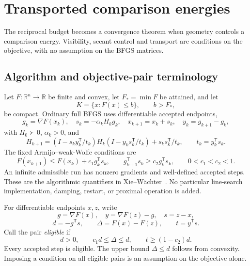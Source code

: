 \chapter{Transported comparison energies}\label{comp:T}\label{T:chapter}
\renewcommand{\ModuleTag}{3}
The reciprocal budget becomes a convergence theorem when geometry controls a comparison energy. Visibility, secant control and transport are conditions on the objective, with no assumption on the BFGS matrices.


\begingroup
\providecommand{\R}{}
\renewcommand{\R}{\mathbb R}
\providecommand{\tr}{}
\renewcommand{\tr}{\operatorname{tr}}
\providecommand{\diag}{}
\renewcommand{\diag}{\operatorname{diag}}
\providecommand{\Span}{}
\renewcommand{\Span}{\operatorname{span}}
\providecommand{\ip}{}
\renewcommand{\ip}[2]{\langle #1,#2\rangle}
\providecommand{\norm}{}
\renewcommand{\norm}[1]{\lVert #1\rVert}
\providecommand{\T}{}
\renewcommand{\T}{^{\mathsf T}}
\providecommand{\D}{}
\renewcommand{\D}{\mathcal D}
\setcounter{section}{1}
\setcounter{theorem}{0}
\setcounter{lemma}{0}
\setcounter{corollary}{0}
\setcounter{proposition}{0}
\setcounter{remark}{0}
\setcounter{equation}{2}


\section{Algorithm and objective-pair terminology}
Let $F:\R^n\to\R$ be finite and convex, let $F_*=\min F$ be attained, and let
\[
 K=\{x:F(x)\le b\},\qquad b>F_*,
\]
be compact. Ordinary full BFGS uses differentiable accepted endpoints,
\[
 g_k=\nabla F(x_k),\quad s_k=-\alpha_kH_kg_k,\quad
 x_{k+1}=x_k+s_k,\quad y_k=g_{k+1}-g_k,
\]
with $H_0\succ0$, $\alpha_k>0$, and
\[
 H_{k+1}=(I-s_ky_k\T/t_k)H_k(I-y_ks_k\T/t_k)+s_ks_k\T/t_k,
 \qquad t_k=y_k\T s_k.
\]
The fixed Armijo--weak-Wolfe conditions are
\[
 F(x_{k+1})\le F(x_k)+c_1g_k\T s_k,\qquad
 g_{k+1}\T s_k\ge c_2g_k\T s_k,\qquad 0<c_1<c_2<1.
\]
An infinite admissible run has nonzero gradients and well-defined accepted steps. These are the algorithmic quantifiers in Xie--W\"achter~\cite{XW}. No particular line-search implementation, damping, restart, or proximal operation is added.

For differentiable endpoints $x,z$, write
\[
 g=\nabla F(x),\quad y=\nabla F(z)-g,\quad s=z-x,
\]
\[
 d=-g\T s,\qquad \Delta=F(x)-F(z),\qquad t=y\T s.
\]
Call the pair \emph{eligible} if
\begin{equation}
 d>0,\qquad c_1d\le\Delta\le d,\qquad t\ge(1-c_2)d. \tag{3.2}
\end{equation}
Every accepted step is eligible. The upper bound $\Delta\le d$ follows from convexity. Imposing a condition on all eligible pairs is an assumption on the objective alone.

